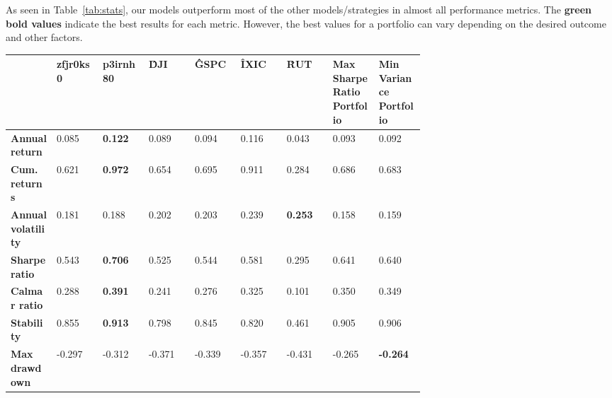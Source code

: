 \documentclass[../xlapes02]{subfiles}
\begin{document}
    As seen in Table~\cref{tab:stats}, our models outperform most of the other models/strategies in almost all performance metrics. The \textcolor[HTML]{00F000}{\textbf{green bold values}} indicate the best results for each metric. However, the best values for a portfolio can vary depending on the desired outcome and other factors.

    \begin{table}
        \centering
        {\footnotesize\begin{tabular}{*{9}{|m{0.075\linewidth}|}}
                          \toprule
                          & \bfseries zfjr0ks0 & \bfseries p3irnh80                   & \bfseries \^DJI                       & \bfseries \^GSPC & \bfseries \^IXIC & \bfseries \^RUT & \bfseries Max Sharpe Ratio Portfolio & \bfseries Min Variance Portfolio \\[0.5cm]
                          \midrule
                          \bfseries Annual return       & 0.085              & \color[HTML]{00F000} \bfseries 0.122 & 0.089                                 & 0.094            & 0.116 & 0.043 & 0.093 & 0.092 \\[0.5cm]
                          \bfseries Cum. returns        & 0.621              & \color[HTML]{00F000} \bfseries 0.972 & 0.654                                 & 0.695            & 0.911 & 0.284 & 0.686 & 0.683 \\[0.5cm]
                          \bfseries Annual volatility   & 0.181              & 0.188                                & 0.202                                 & 0.203            & 0.239            & \color[HTML]{00F000} \bfseries 0.253 & 0.158 & 0.159 \\[0.5cm]
                          \bfseries Sharpe ratio        & 0.543              & \color[HTML]{00F000} \bfseries 0.706 & 0.525                                 & 0.544            & 0.581 & 0.295 & 0.641 & 0.640 \\[0.5cm]
                          \bfseries Calmar ratio        & 0.288              & \color[HTML]{00F000} \bfseries 0.391 & 0.241                                 & 0.276            & 0.325 & 0.101 & 0.350 & 0.349 \\[0.5cm]
                          \bfseries Stability           & 0.855              & \color[HTML]{00F000} \bfseries 0.913 & 0.798                                 & 0.845            & 0.820 & 0.461 & 0.905 & 0.906 \\[0.5cm]
                          \bfseries Max drawdown        & -0.297             & -0.312                               & -0.371                                & -0.339           & -0.357           & -0.431                               & -0.265                               & \color[HTML]{00F000} \bfseries -0.264 \\[0.5cm]

\end{tabular}}
\end{table}
\end{document}
